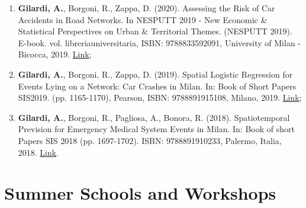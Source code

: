 \documentclass[11pt,a4paper,sans]{moderncv}
\begin{document}
\begin{enumerate}
  \item \textbf{Gilardi, A.}, Borgoni, R., Zappa, D. (2020). Assessing the Risk of Car Accidents in Road Networks. In NESPUTT 2019 - New Economic \& Statistical Perspectives on Urban \& Territorial Themes. (NESPUTT 2019). E-book. vol. libreriauniversitaria, ISBN: 9788833592091, University of Milan - Bicocca, 2019.  \href{https://www.libreriauniversitaria.it/ebook/9788833592091/autore-riccardo-borgoni/new-economic-statistical-perspectives-on-urban-and-territorial-themes-nesputt-2019-e-book.htm}{Link};
  \item \textbf{Gilardi, A.}, Borgoni, R., Zappa, D. (2019). Spatial Logistic Regression for Events Lying on a Network: Car Crashes in Milan. In: Book of Short Papers SIS2019. (pp. 1165-1170), Pearson, ISBN: 9788891915108, Milano, 2019.   \href{https://it.pearson.com/content/dam/region-core/italy/pearson-italy/pdf/Dirigenti%20e%20istituzioni/ISTITUZIONI-HE-PDF-sis2019_V4.pdf}{Link};
  \item \textbf{Gilardi, A.}, Borgoni, R., Pagliosa, A., Bonora, R. (2018).  Spatiotemporal Prevision for Emergency Medical System Events in Milan. In: Book of short Papers SIS 2018 (pp. 1697-1702). ISBN: 9788891910233, Palermo, Italia, 2018. \href{https://it.pearson.com/content/dam/region-core/italy/pearson-italy/pdf/Dirigenti%20e%20istituzioni/ISTITUZIONI%20-%20HE%20-%20PDF%20-%20SIS%20V4.pdf}{Link}. 
  \end{enumerate}

  \section{Summer Schools and Workshops}
  
\end{document}

